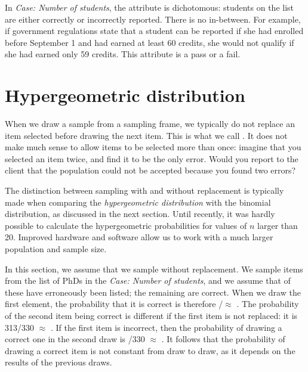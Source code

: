 In \emph{Case: Number of students}, the attribute is dichotomous: students on the list are either correctly or incorrectly reported. There is no in-between. For example, if government regulations state that a student can be reported if she had enrolled before September 1 and had earned at least 60 credits, she would not qualify if she had earned only 59 credits. This attribute is a pass or a fail.

\section{Hypergeometric distribution} %
\label{sec:hypergeometric_distribution}

When we draw a sample from a sampling frame, we typically do not replace an item selected before drawing the next item. This is what we call . It does not make much sense to allow items to be selected more than once: imagine that you selected an item twice, and find it to be the only error. Would you report to the client that the population could not be accepted because you found two errors?

The distinction between sampling with and without replacement is typically made when comparing the \emph{hypergeometric distribution} with the binomial distribution, as discussed in the next section. Until recently, it was hardly possible to calculate the hypergeometric probabilities for values of $n$ larger than 20. Improved hardware and software allow us to work with a much larger population and sample size.

In this section, we assume that we sample without replacement. We sample \ProbSampleSize items from the list of \ProbPopulationSize PhDs in the \emph{Case: Number of students}, and we assume that \ProbErrorCount of these have erroneously been listed; the remaining \ProbCorrectCount are correct. When we draw the first element, the probability that it is correct is therefore \ProbCorrectCount/\ProbPopulationSize $\approx$ \ProbFirstCorrectProbability. The probability of the second item being correct is different if the first item is not replaced: it is 313/330 $\approx$ \ProbSecondCorrectGivenFirstCorrect. If the first item is incorrect, then the probability of drawing a correct one in the second draw is \ProbCorrectCount/330 $\approx$ \ProbSecondCorrectGivenFirstIncorrect. It follows that the probability of drawing a correct item is not constant from draw to draw, as it depends on the results of the previous draws.

